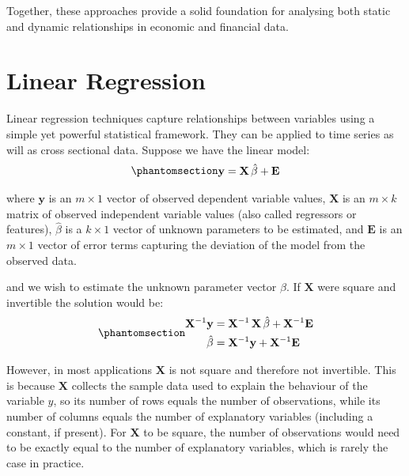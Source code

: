 \documentclass[
  letterpaper,
  DIV=11,
  numbers=noendperiod]{scrreprt}
\begin{document}
Together, these approaches provide a solid foundation for analysing both
static and dynamic relationships in economic and financial data.

\section{Linear Regression}\label{sec:linReg}

Linear regression techniques capture relationships between variables
using a simple yet powerful statistical framework. They can be applied
to time series as will as cross sectional data. Suppose we have the
linear model:
\begin{equation}\protect\phantomsection\label{eq-linear-regression}{  
\begin{align}
    \mathbf{y} = \mathbf{X}\, \hat{\beta} + \mathbf{E}
\end{align}
}\end{equation}

where \(\mathbf{y}\) is an \(m \times 1\) vector of observed dependent
variable values, \(\mathbf{X}\) is an \(m \times k\) matrix of observed
independent variable values (also called regressors or features),
\(\hat{\beta}\) is a \(k \times 1\) vector of unknown parameters to be
estimated, and \(\mathbf{E}\) is an \(m \times 1\) vector of error terms
capturing the deviation of the model from the observed data.

and we wish to estimate the unknown parameter vector \(\beta\). If
\(\mathbf{X}\) were square and invertible the solution would be:
\begin{equation}\protect\phantomsection\label{eq-gen-0086}{  
\begin{align}
    \mathbf{X}^{-1}\mathbf{y} &= \mathbf{X}^{-1}\, \mathbf{X}\, \hat{\beta} + \mathbf{X}^{-1} \mathbf{E} \nonumber \\
    \hat{\beta} &= \mathbf{X}^{-1}\mathbf{y} + \mathbf{X}^{-1} \mathbf{E}
\end{align}
}\end{equation}

However, in most applications \(\mathbf{X}\) is not square and therefore
not invertible. This is because \(\mathbf{X}\) collects the sample data
used to explain the behaviour of the variable \(y\), so its number of
rows equals the number of observations, while its number of columns
equals the number of explanatory variables (including a constant, if
present). For \(\mathbf{X}\) to be square, the number of observations
would need to be exactly equal to the number of explanatory variables,
which is rarely the case in practice.
\end{document}

